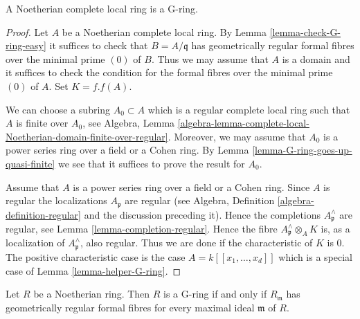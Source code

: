 \begin{proposition}
\label{proposition-Noetherian-complete-G-ring}
A Noetherian complete local ring is a G-ring.
\end{proposition}

\begin{proof}
Let $A$ be a Noetherian complete local ring. By
Lemma \ref{lemma-check-G-ring-easy}
it suffices to check that $B = A/\mathfrak q$ has geometrically regular
formal fibres over the minimal prime $(0)$ of $B$. Thus we may assume
that $A$ is a domain and it suffices to check the condition for
the formal fibres over the minimal prime $(0)$ of $A$.
Set $K = f.f(A)$.

\medskip\noindent
We can choose a subring $A_0 \subset A$ which is a regular complete local
ring such that $A$ is finite over $A_0$, see Algebra, Lemma
\ref{algebra-lemma-complete-local-Noetherian-domain-finite-over-regular}.
Moreover, we may assume that $A_0$ is a power series ring over a
field or a Cohen ring. By Lemma \ref{lemma-G-ring-goes-up-quasi-finite}
we see that it suffices to prove the result for $A_0$.

\medskip\noindent
Assume that $A$ is a power series ring over a field or a Cohen ring.
Since $A$ is regular the localizations $A_\mathfrak p$ are regular
(see Algebra, Definition \ref{algebra-definition-regular} and the
discussion preceding it).
Hence the completions $A_\mathfrak p^\wedge$ are regular, see
Lemma \ref{lemma-completion-regular}.
Hence the fibre $A_{\mathfrak p}^\wedge \otimes_A K$ is, as a localization
of $A_\mathfrak p^\wedge$, also regular. Thus we are done if the
characteristic of $K$ is $0$. The positive characteristic case
is the case $A = k[[x_1, \ldots, x_d]]$ which is a special case of
Lemma \ref{lemma-helper-G-ring}.
\end{proof}

\begin{lemma}
\label{lemma-check-G-ring-maximal-ideals}
Let $R$ be a Noetherian ring. Then $R$ is a G-ring if and only if
$R_\mathfrak m$ has geometrically regular formal fibres for every
maximal ideal $\mathfrak m$ of $R$.
\end{lemma}

